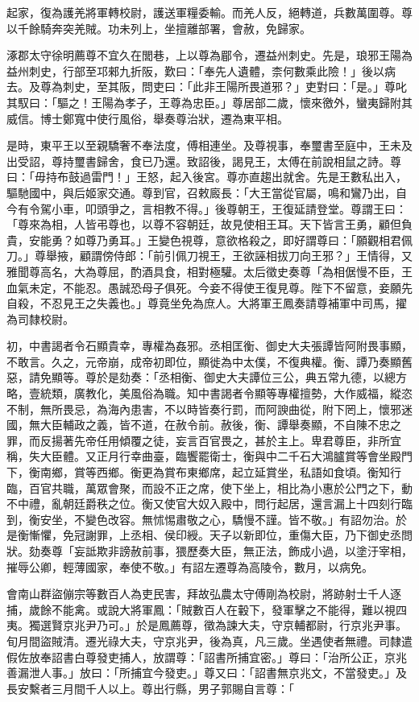 \begin{pinyinscope}
起家，復為護羌將軍轉校尉，護送軍糧委輸。而羌人反，絕轉道，兵數萬圍尊。尊以千餘騎奔突羌賊。功未列上，坐擅離部署，會赦，免歸家。

涿郡太守徐明薦尊不宜久在閭巷，上以尊為郿令，遷益州刺史。先是，琅邪王陽為益州刺史，行部至邛郲九折阪，歎曰：「奉先人遺體，柰何數乘此險！」後以病去。及尊為刺史，至其阪，問吏曰：「此非王陽所畏道邪？」吏對曰：「是。」尊叱其馭曰：「驅之！王陽為孝子，王尊為忠臣。」尊居部二歲，懷來徼外，蠻夷歸附其威信。博士鄭寬中使行風俗，舉奏尊治狀，遷為東平相。

是時，東平王以至親驕奢不奉法度，傅相連坐。及尊視事，奉璽書至庭中，王未及出受詔，尊持璽書歸舍，食已乃還。致詔後，謁見王，太傅在前說相鼠之詩。尊曰：「毋持布鼓過雷門！」王怒，起入後宮。尊亦直趨出就舍。先是王數私出入，驅馳國中，與后姬家交通。尊到官，召敕廄長：「大王當從官屬，鳴和鸞乃出，自今有令駕小車，叩頭爭之，言相教不得。」後尊朝王，王復延請登堂。尊謂王曰：「尊來為相，人皆弔尊也，以尊不容朝廷，故見使相王耳。天下皆言王勇，顧但負貴，安能勇？如尊乃勇耳。」王變色視尊，意欲格殺之，即好謂尊曰：「願觀相君佩刀。」尊舉掖，顧謂傍侍郎：「前引佩刀視王，王欲誣相拔刀向王邪？」王情得，又雅聞尊高名，大為尊屈，酌酒具食，相對極驩。太后徵史奏尊「為相倨慢不臣，王血氣未定，不能忍。愚誠恐母子俱死。今妾不得使王復見尊。陛下不留意，妾願先自殺，不忍見王之失義也。」尊竟坐免為庶人。大將軍王鳳奏請尊補軍中司馬，擢為司隸校尉。

初，中書謁者令石顯貴幸，專權為姦邪。丞相匡衡、御史大夫張譚皆阿附畏事顯，不敢言。久之，元帝崩，成帝初即位，顯徙為中太僕，不復典權。衡、譚乃奏顯舊惡，請免顯等。尊於是劾奏：「丞相衡、御史大夫譚位三公，典五常九德，以總方略，壹統類，廣教化，美風俗為職。知中書謁者令顯等專權擅勢，大作威福，縱恣不制，無所畏忌，為海內患害，不以時皆奏行罰，而阿諛曲從，附下罔上，懷邪迷國，無大臣輔政之義，皆不道，在赦令前。赦後，衡、譚舉奏顯，不自陳不忠之罪，而反揚著先帝任用傾覆之徒，妄言百官畏之，甚於主上。卑君尊臣，非所宜稱，失大臣體。又正月行幸曲臺，臨饗罷衛士，衡與中二千石大鴻臚賞等會坐殿門下，衡南鄉，賞等西鄉。衡更為賞布東鄉席，起立延賞坐，私語如食頃。衡知行臨，百官共職，萬眾會聚，而設不正之席，使下坐上，相比為小惠於公門之下，動不中禮，亂朝廷爵秩之位。衡又使官大奴入殿中，問行起居，還言漏上十四刻行臨到，衡安坐，不變色改容。無怵惕肅敬之心，驕慢不謹。皆不敬。」有詔勿治。於是衡慚懼，免冠謝罪，上丞相、侯印綬。天子以新即位，重傷大臣，乃下御史丞問狀。劾奏尊「妄詆欺非謗赦前事，猥歷奏大臣，無正法，飾成小過，以塗汙宰相，摧辱公卿，輕薄國家，奉使不敬。」有詔左遷尊為高陵令，數月，以病免。

會南山群盜傰宗等數百人為吏民害，拜故弘農太守傅剛為校尉，將跡射士千人逐捕，歲餘不能禽。或說大將軍鳳：「賊數百人在轂下，發軍擊之不能得，難以視四夷。獨選賢京兆尹乃可。」於是鳳薦尊，徵為諫大夫，守京輔都尉，行京兆尹事。旬月間盜賊清。遷光祿大夫，守京兆尹，後為真，凡三歲。坐遇使者無禮。司隸遣假佐放奉詔書白尊發吏捕人，放謂尊：「詔書所捕宜密。」尊曰：「治所公正，京兆善漏泄人事。」放曰：「所捕宜今發吏。」尊又曰：「詔書無京兆文，不當發吏。」及長安繫者三月間千人以上。尊出行縣，男子郭賜自言尊：「


\end{pinyinscope}
